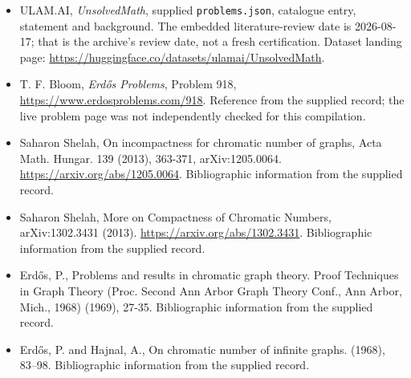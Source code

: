 \documentclass[11pt,a4paper]{article}
\begin{document}
{\small

\begin{itemize}

\item[\hypertarget{source:statement:1}{S1}] ULAM.AI, \emph{UnsolvedMath}, supplied \texttt{problems.json}, catalogue entry, statement and background. The embedded literature-review date is 2026-08-17; that is the archive’s review date, not a fresh certification. Dataset landing page: \url{https://huggingface.co/datasets/ulamai/UnsolvedMath}.

\item[\hypertarget{source:statement:2}{S2}] T. F. Bloom, \emph{Erdős Problems}, Problem 918, \url{https://www.erdosproblems.com/918}. Reference from the supplied record; the live problem page was not independently checked for this compilation.

\item[\hypertarget{source:statement:3}{S3}] Saharon Shelah, On incompactness for chromatic number of graphs, Acta Math. Hungar. 139 (2013), 363-371, arXiv:1205.0064. \url{https://arxiv.org/abs/1205.0064}. Bibliographic information from the supplied record.

\item[\hypertarget{source:statement:4}{S4}] Saharon Shelah, More on Compactness of Chromatic Numbers, arXiv:1302.3431 (2013). \url{https://arxiv.org/abs/1302.3431}. Bibliographic information from the supplied record.

\item[\hypertarget{source:statement:5}{S5}] Erd\H{o}s, P., Problems and results in chromatic graph theory. Proof Techniques in Graph Theory (Proc. Second Ann Arbor Graph Theory Conf., Ann Arbor, Mich., 1968) (1969), 27-35. Bibliographic information from the supplied record.

\item[\hypertarget{source:statement:6}{S6}] Erd\H{o}s, P. and Hajnal, A., On chromatic number of infinite graphs. (1968), 83--98. Bibliographic information from the supplied record.

\end{itemize}

}

\label{end:statement}
\end{document}

